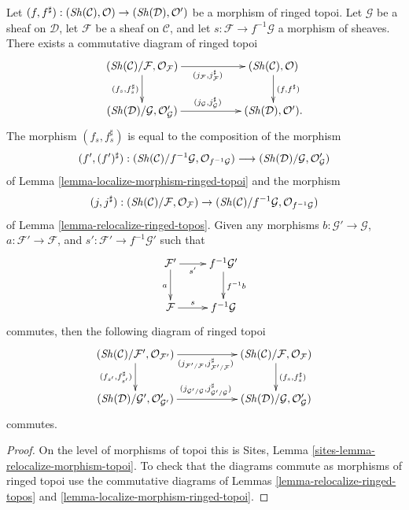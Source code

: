 \begin{lemma}
\label{lemma-relocalize-morphism-ringed-topoi}
Let
$(f, f^\sharp) :
(\mathop{\mathit{Sh}}\nolimits(\mathcal{C}), \mathcal{O})
\to
(\mathop{\mathit{Sh}}\nolimits(\mathcal{D}), \mathcal{O}')$
be a morphism of ringed topoi.
Let $\mathcal{G}$ be a sheaf on $\mathcal{D}$,
let $\mathcal{F}$ be a sheaf on $\mathcal{C}$,
and let $s : \mathcal{F} \to f^{-1}\mathcal{G}$ a morphism of sheaves.
There exists a commutative diagram of ringed topoi
$$
\xymatrix{
(\Sh(\mathcal{C})/\mathcal{F}, \mathcal{O}_\mathcal{F})
\ar[rr]_{(j_\mathcal{F}, j_\mathcal{F}^\sharp)}
\ar[d]_{(f_s, f_s^\sharp)} & &
(\Sh(\mathcal{C}), \mathcal{O})
\ar[d]^{(f, f^\sharp)} \\
(\Sh(\mathcal{D})/\mathcal{G}, \mathcal{O}'_\mathcal{G})
\ar[rr]^{(j_\mathcal{G}, j_\mathcal{G}^\sharp)} & &
(\Sh(\mathcal{D}), \mathcal{O}').
}
$$
The morphism $(f_s, f_s^\sharp)$
is equal to the composition of the morphism
$$
(f', (f')^\sharp) :
(\mathop{\mathit{Sh}}\nolimits(\mathcal{C})/f^{-1}\mathcal{G}, \mathcal{O}_{f^{-1}\mathcal{G}})
\longrightarrow
(\mathop{\mathit{Sh}}\nolimits(\mathcal{D})/{\mathcal{G}}, \mathcal{O}'_\mathcal{G})
$$
of
Lemma \ref{lemma-localize-morphism-ringed-topoi}
and the morphism
$$
(j, j^\sharp) :
(\mathop{\mathit{Sh}}\nolimits(\mathcal{C})/\mathcal{F}, \mathcal{O}_\mathcal{F})
\to
(\mathop{\mathit{Sh}}\nolimits(\mathcal{C})/f^{-1}\mathcal{G}, \mathcal{O}_{f^{-1}\mathcal{G}})
$$
of
Lemma \ref{lemma-relocalize-ringed-topos}.
Given any morphisms $b : \mathcal{G}' \to \mathcal{G}$,
$a : \mathcal{F}' \to \mathcal{F}$, and
$s' : \mathcal{F}' \to f^{-1}\mathcal{G}'$ such that
$$
\xymatrix{
\mathcal{F}' \ar[r]_-{s'} \ar[d]_a &
f^{-1}\mathcal{G}' \ar[d]^{f^{-1}b} \\
\mathcal{F} \ar[r]^-s &
f^{-1}\mathcal{G}
}
$$
commutes, then the following diagram of ringed topoi
$$
\xymatrix{
(\Sh(\mathcal{C})/\mathcal{F}', \mathcal{O}_{\mathcal{F}'})
\ar[rr]_{(j_{\mathcal{F}'/\mathcal{F}}, j_{\mathcal{F}'/\mathcal{F}}^\sharp)}
\ar[d]_{(f_{s'}, f_{s'}^\sharp)} & &
(\Sh(\mathcal{C})/\mathcal{F}, \mathcal{O}_\mathcal{F})
\ar[d]^{(f_s, f_s^\sharp)} \\
(\Sh(\mathcal{D})/\mathcal{G}', \mathcal{O}'_{\mathcal{G}'})
\ar[rr]^{(j_{\mathcal{G}'/\mathcal{G}}, j_{\mathcal{G}'/\mathcal{G}}^\sharp)}
& &
(\Sh(\mathcal{D})/\mathcal{G}, \mathcal{O}'_\mathcal{G})
}
$$
commutes.
\end{lemma}

\begin{proof}
On the level of morphisms of topoi this is
Sites, Lemma \ref{sites-lemma-relocalize-morphism-topoi}.
To check that the diagrams commute as morphisms of ringed topoi use
the commutative diagrams of
Lemmas \ref{lemma-relocalize-ringed-topos} and
\ref{lemma-localize-morphism-ringed-topoi}.
\end{proof}

